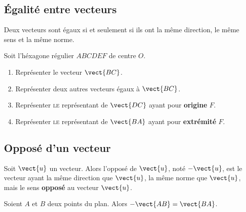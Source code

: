 \documentclass{article}
\begin{document}
\subsection{Égalité entre vecteurs}
\begin{tcolorbox}
\begin{definition}
Deux vecteurs sont égaux si et seulement si ils ont la même direction, le même sens et la même norme.
\end{definition}
\end{tcolorbox}
\begin{example}
Soit l'héxagone régulier $ABCDEF$ de centre $O$.
\begin{center}
\end{center}
\begin{enumerate}[label=\emph{\alph*)}]
\item Représenter le vecteur $\vect{BC}$.
\item Représenter deux autres vecteurs égaux à $\vect{BC}$.
\item Représenter \textsc{le} représentant de $\vect{DC}$ ayant pour \textbf{origine} $F$.
\item Représenter \textsc{le} représentant de $\vect{BA}$ ayant pour \textbf{extrémité} $F$.
\end{enumerate}
\end{example}
\subsection{Opposé d'un vecteur}
\begin{tcolorbox}
\begin{definition}
Soit $\vect{u}$ un vecteur. Alors l'opposé de $\vect{u}$, noté $- \vect{u}$, est le vecteur ayant la même direction que $\vect{u}$, la même norme que $\vect{u}$, mais le sens \textbf{opposé} au vecteur $\vect{u}$.  
\end{definition}
\end{tcolorbox}
\begin{proposition}
Soient $A$ et $B$ deux points du plan. Alors $- \vect{AB} = \vect{BA}$.
\end{proposition}
\end{document}
